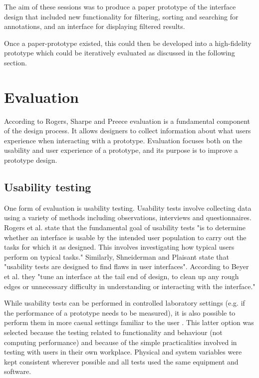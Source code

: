 The aim of these sessions was to produce a paper prototype of the interface design that included new functionality for filtering, sorting and searching for annotations, and an interface for displaying filtered results. 

Once a paper-prototype existed, this could then be developed into a high-fidelity prototype which could be iteratively evaluated as discussed in the following section. 

\section{Evaluation}
According to Rogers, Sharpe and Preece \citep[p. 433]{RogersPreece} evaluation is a fundamental component of the design process. It allows designers to collect information about what users experience when interacting with a prototype. Evaluation focuses both on the usability and user experience of a prototype, and its purpose is to improve a prototype design.
\subsection{Usability testing}
One form of evaluation is usability testing. Usability tests involve collecting data using a variety of methods including observations, interviews and questionnaires. Rogers et al. \citep[p. 438]{RogersPreece}  state that the fundamental goal of usability tests "is to determine whether an interface is usable by the intended user population to carry out the tasks for which it as designed. This involves investigating how typical users perform on typical tasks." Similarly, Shneiderman and Plaisant \citep[p. 144]{ShneidermanPlaisant} state that "usability tests are designed to find flaws in user interfaces". According to Beyer et al. \citep[p. 373]{BeyerHoltzblatt} they "tune an interface at the tail end of design, to clean up any rough edges or unnecessary difficulty in understanding or interacting with the interface."

While usability tests can be performed in controlled laboratory settings (e.g. if the performance of a prototype needs to be measured), it is also possible to perform them in more casual settings familiar to the user \citep[p. 438]{RogersPreece}. This latter option was selected because the testing related to functionality and behaviour (not computing performance) and because of the simple practicalities involved in testing with users in their own workplace. Physical and system variables were kept consistent wherever possible and all tests used the same equipment and software. 

